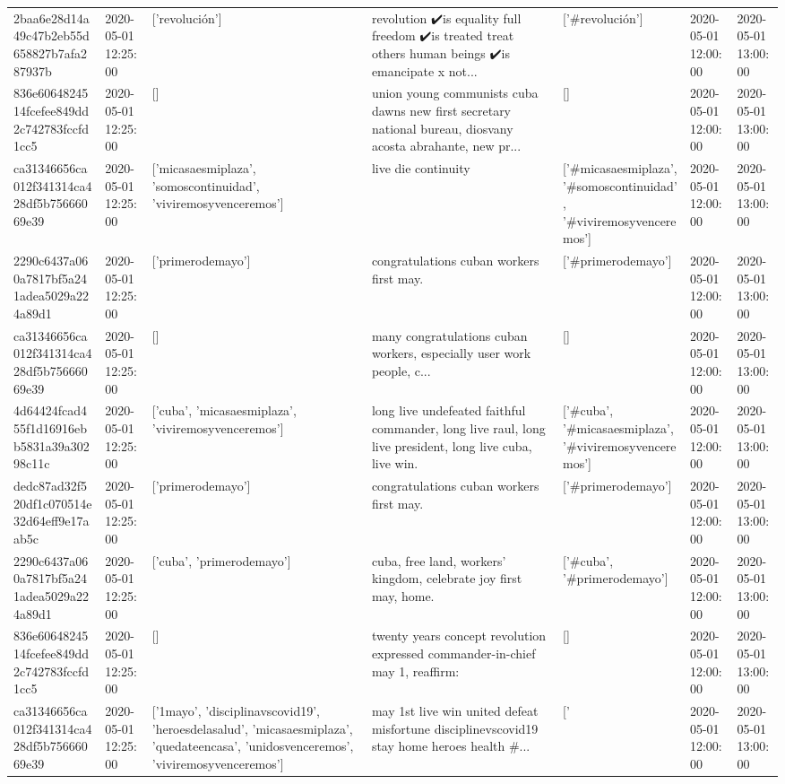 \begin{tabular}{lllllll}
2baa6e28d14a49c47b2eb55d658827b7afa287937b & 2020-05-01 12:25:00 & ['revolución'] & revolution ✔️is equality full freedom ✔️is treated treat others human beings ✔️is emancipate x not... & ['#revolución'] & 2020-05-01 12:00:00 & 2020-05-01 13:00:00 \\
836e6064824514fcefee849dd2c742783fccfd1cc5 & 2020-05-01 12:25:00 & [] & union young communists cuba dawns new first secretary national bureau, diosvany acosta abrahante, new pr... & [] & 2020-05-01 12:00:00 & 2020-05-01 13:00:00 \\
ca31346656ca012f341314ca428df5b75666069e39 & 2020-05-01 12:25:00 & ['micasaesmiplaza', 'somoscontinuidad', 'viviremosyvenceremos'] & live die continuity & ['#micasaesmiplaza', '#somoscontinuidad', '#viviremosyvenceremos'] & 2020-05-01 12:00:00 & 2020-05-01 13:00:00 \\
2290c6437a060a7817bf5a241adea5029a224a89d1 & 2020-05-01 12:25:00 & ['primerodemayo'] & congratulations cuban workers first may. & ['#primerodemayo'] & 2020-05-01 12:00:00 & 2020-05-01 13:00:00 \\
ca31346656ca012f341314ca428df5b75666069e39 & 2020-05-01 12:25:00 & [] & many congratulations cuban workers, especially user work people, c... & [] & 2020-05-01 12:00:00 & 2020-05-01 13:00:00 \\
4d64424fcad455f1d16916ebb5831a39a30298c11c & 2020-05-01 12:25:00 & ['cuba', 'micasaesmiplaza', 'viviremosyvenceremos'] & long live undefeated faithful commander, long live raul, long live president, long live cuba, live win. & ['#cuba', '#micasaesmiplaza', '#viviremosyvenceremos'] & 2020-05-01 12:00:00 & 2020-05-01 13:00:00 \\
dedc87ad32f520df1c070514e32d64eff9e17aab5c & 2020-05-01 12:25:00 & ['primerodemayo'] & congratulations cuban workers first may. & ['#primerodemayo'] & 2020-05-01 12:00:00 & 2020-05-01 13:00:00 \\
2290c6437a060a7817bf5a241adea5029a224a89d1 & 2020-05-01 12:25:00 & ['cuba', 'primerodemayo'] & cuba, free land, workers' kingdom, celebrate joy first may, home. & ['#cuba', '#primerodemayo'] & 2020-05-01 12:00:00 & 2020-05-01 13:00:00 \\
836e6064824514fcefee849dd2c742783fccfd1cc5 & 2020-05-01 12:25:00 & [] & twenty years concept revolution expressed commander-in-chief may 1, reaffirm: & [] & 2020-05-01 12:00:00 & 2020-05-01 13:00:00 \\
ca31346656ca012f341314ca428df5b75666069e39 & 2020-05-01 12:25:00 & ['1mayo', 'disciplinavscovid19', 'heroesdelasalud', 'micasaesmiplaza', 'quedateencasa', 'unidosvenceremos', 'viviremosyvenceremos'] & may 1st live win united defeat misfortune disciplinevscovid19 stay home heroes health \#... & ['#1mayo', '#heroesdelasalud', '#micasaesmiplaza', '#quedateencasa', '#unidosvenceremos', '#viviremosyvenceremos'] & 2020-05-01 12:00:00 & 2020-05-01 13:00:00 \\

\end{tabular}

